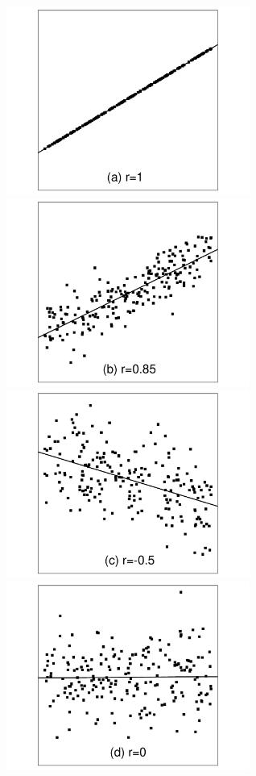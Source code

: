 \documentclass[11pt,a4paper,openany]{book}
\begin{document}
\includegraphics[width=8.00000cm]{olspl1.pdf}
\includegraphics[width=8.00000cm]{olspl2.pdf}\\
\includegraphics[width=8.00000cm]{olspl3.pdf}
\includegraphics[width=8.00000cm]{olspl4.pdf}\\
\end{document}
